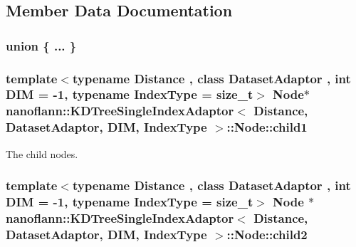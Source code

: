 \subsection{Member Data Documentation}
\hypertarget{structnanoflann_1_1_k_d_tree_single_index_adaptor_1_1_node_a70b67887a7c5315704efba80158a160e}{\subsubsection[{"@1}]{\setlength{\rightskip}{0pt plus 5cm}union \{ ... \} }}\label{structnanoflann_1_1_k_d_tree_single_index_adaptor_1_1_node_a70b67887a7c5315704efba80158a160e}
\hypertarget{structnanoflann_1_1_k_d_tree_single_index_adaptor_1_1_node_aa30c3005b106e10828ba100a76e26bf7}{
\subsubsection[{child1}]{\setlength{\rightskip}{0pt plus 5cm}template$<$typename Distance , class Dataset\-Adaptor , int D\-I\-M = -\/1, typename Index\-Type  = size\-\_\-t$>$ {\bf Node}$\ast$ {\bf nanoflann\-::\-K\-D\-Tree\-Single\-Index\-Adaptor}$<$ Distance, Dataset\-Adaptor, D\-I\-M, Index\-Type $>$\-::Node\-::child1}}\label{structnanoflann_1_1_k_d_tree_single_index_adaptor_1_1_node_aa30c3005b106e10828ba100a76e26bf7}
The child nodes. \hypertarget{structnanoflann_1_1_k_d_tree_single_index_adaptor_1_1_node_a6a4cc4e634f70ba54f4dc33ac958ba3b}{
\subsubsection[{child2}]{\setlength{\rightskip}{0pt plus 5cm}template$<$typename Distance , class Dataset\-Adaptor , int D\-I\-M = -\/1, typename Index\-Type  = size\-\_\-t$>$ {\bf Node} $\ast$ {\bf nanoflann\-::\-K\-D\-Tree\-Single\-Index\-Adaptor}$<$ Distance, Dataset\-Adaptor, D\-I\-M, Index\-Type $>$\-::Node\-::child2}}\label{structnanoflann_1_1_k_d_tree_single_index_adaptor_1_1_node_a6a4cc4e634f70ba54f4dc33ac958ba3b}
